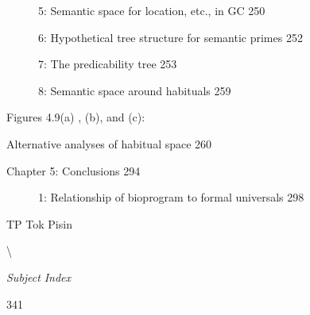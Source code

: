 \begin{figure}
\caption{5: Semantic space for location, etc., in GC 250}
\label{fig:4}
\end{figure}

\begin{figure}
\caption{6: Hypothetical tree structure for semantic primes 252}
\label{fig:4}
\end{figure}

\begin{figure}
\caption{7: The predicability tree 253}
\label{fig:4}
\end{figure}

\begin{figure}
\caption{8: Semantic space around habituals 259}
\label{fig:4}
\end{figure}

Figures 4.9(a) , (b), and (c):

Alternative analyses of habitual space 260

Chapter 5: Conclusions 294

\begin{figure}
\caption{1: Relationship of bioprogram to formal universals 298}
\label{fig:5}
\end{figure}

TP Tok Pisin 

{\textbackslash}

\textit{Subject} \textit{Index}

341

